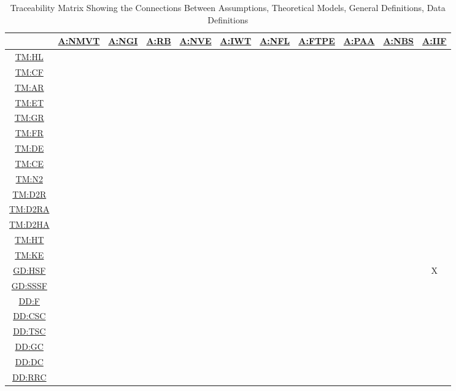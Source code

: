 \documentclass[12pt]{article}
\newcommand{\hpref}[1]{\hyperref[#1]{#1}}
\begin{document}
\begin{table}[H]
\centering
\begin{tabular}{|c|c|c|c|c|c|c|c|c|c|c|}
\hline
	& \hpref{A:NMVT}& \hpref{A:NGI}& \hpref{A:RB}& \hpref{A:NVE}& \hpref{A:IWT}& \hpref{A:NFL}& \hpref{A:FTPE}& \hpref{A:PAA}& \hpref{A:NBS}& \hpref{A:IIF}\\
\hline
\hpref{TM:HL}        & & & & & & & & & & \\ \hline
\hpref{TM:CF}        & & & & & & & & & & \\ \hline
\hpref{TM:AR}        & & & & & & & & & & \\ \hline
\hpref{TM:ET}        & & & & & & & & & & \\ \hline
\hpref{TM:GR}        & & & & & & & & & & \\ \hline
\hpref{TM:FR}        & & & & & & & & & & \\ \hline
\hpref{TM:DE}        & & & & & & & & & & \\ \hline
\hpref{TM:CE}        & & & & & & & & & & \\ \hline
\hpref{TM:N2}        & & & & & & & & & & \\ \hline
\hpref{TM:D2R}       & & & & & & & & & & \\ \hline
\hpref{TM:D2RA}      & & & & & & & & & & \\ \hline
\hpref{TM:D2HA}      & & & & & & & & & & \\ \hline
\hpref{TM:HT}        & & & & & & & & & & \\ \hline
\hpref{TM:KE}        & & & & & & & & & & \\ \hline
\hpref{GD:HSF}         & & & & & & & & & &X \\ \hline
\hpref{GD:SSSF}         & & & & & & & & & & \\ \hline
\hpref{DD:F}        & & & & & & & & & & \\ \hline
\hpref{DD:CSC}        & & & & & & & & & & \\ \hline
\hpref{DD:TSC}        & & & & & & & & & & \\ \hline
\hpref{DD:GC}        & & & & & & & & & & \\ \hline
\hpref{DD:DC}        & & & & & & & & & & \\ \hline
\hpref{DD:RRC}        & & & & & & & & & & \\ \hline
\end{tabular}
\caption{Traceability Matrix Showing the Connections Between Assumptions, Theoretical Models, General Definitions, Data Definitions}
\label{Table:trace_Assumptions_TM}
\end{table}
\end{document}
